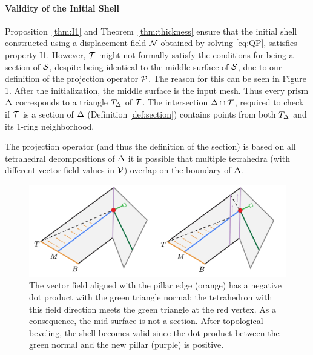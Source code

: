 \paragraph{Validity of the Initial Shell}
Proposition~\ref{thm:I1} and Theorem~\ref{thm:thickness} ensure that the initial shell constructed using a displacement field $\N$ obtained by solving \eqref{eq:QP}, satisfies property I1. However, $\T$ might not formally satisfy the conditions for being a section of $\S$, despite being identical to the middle surface of $\S$, due to our definition of the projection operator $\P$.
%
The reason for this can be seen in Figure \ref{prism:fig:closed}.
After the initialization, the middle surface is the input mesh. Thus every prism $\Prism$ corresponds to a triangle $T_\Prism$ of $\T$. The intersection $\Prism \cap \T$, required to check if $\T$ is a section of $\Prism$ (Definition \ref{def:section}) contains points from both $T_\Prism$ and its 1-ring neighborhood.

The projection operator (and thus the definition of the section) is based on all tetrahedral decompositions of $\Prism$\revision{;} it is possible that multiple tetrahedra (with different vector field values in $\V$) overlap on the boundary of $\Prism$. 


\begin{figure}\centering
    \includegraphics[width=0.9\linewidth]{prism-tex/figs/need_to_bevel}
    \caption{The vector field aligned with the pillar edge (orange) has a negative dot product with the green triangle normal; the tetrahedron with this field direction meets the green triangle at the red vertex. As a consequence, the mid-surface is not a section.
    After topological beveling, the shell becomes valid since the dot product between the green normal and the new pillar (purple) is positive.
    }
    \label{prism:fig:closed}
    
\end{figure}

